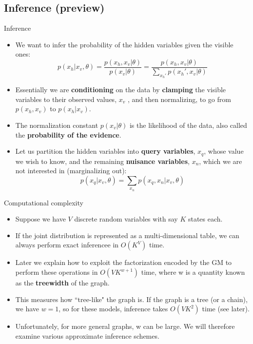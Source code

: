 \documentclass[10pt,mathserif]{beamer}
\begin{document}
\subsection{Inference (preview)}
\begin{frame}{Inference}
\begin{itemize}
    \item We want to infer the probability of the hidden variables given the visible ones:
    \begin{equation}
        p(x_h|x_v,\theta) = \frac{p(x_h, x_v |\theta)}{p(x_v |\theta)}  = \frac{p(x_h, x_v |\theta)}{\sum_{x_h'}p(x_h', x_v |\theta)}
    \end{equation}
    
    \item Essentially we are \textbf{conditioning} on the data by \textbf{clamping} the visible variables to their observed values, $x_v$ , and then normalizing, to go from $p(x_h, x_v )$ to $p(x_h|x_v )$.
    
    \item The normalization constant $p(x_v |\theta)$ is the likelihood of the data, also called the \textbf{probability of the evidence}.
    
    \item Let us partition the hidden variables into \textbf{query variables}, $x_q$, whose value we wish to know, and the remaining \textbf{nuisance variables}, $x_n$, which we are not interested in (marginalizing out):
    \begin{equation}
        p(x_q|x_v , \theta) =  \sum_{x_n} p(x_q, x_n|x_v , \theta)
    \end{equation}
\end{itemize}
\end{frame}

\begin{frame}{Computational complexity}
\begin{itemize}
    \item Suppose we have $V$ discrete random variables with say $K$ states each.
    \item If the joint distribution is represented as a multi-dimensional table, we can always perform exact inferencee in $O(K^V )$ time.
    \item Later we explain how to exploit the factorization encoded by the GM to perform these operations in $O(VK^{w+1})$ time, where w is a quantity known as the \textbf{treewidth} of the graph.
    \item This measures how ``tree-like" the graph is. If the graph is a tree (or a chain), we have $w = 1$, so for these models, inference takes $O(VK^2)$ time (see later).
    \item Unfortunately, for more general graphs, w can be large. We will therefore examine various approximate inference schemes.
\end{itemize}
\end{frame}
\end{document}
